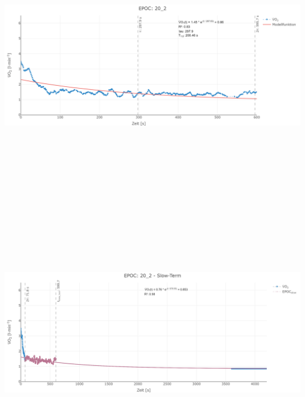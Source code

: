 \documentclass[
  letterpaper,
  DIV=11]{scrartcl}
\begin{document}
\includegraphics[width=11.45833in,height=4.6875in]{images/20_2_tau.png}
\includegraphics[width=11.45833in,height=4.6875in]{images/20_2_slow.png}
\end{document}
